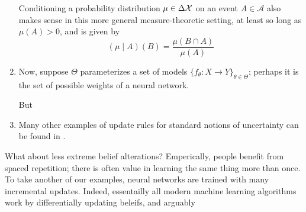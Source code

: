 \documentclass{article}
\begin{document}
\begin{enumerate}
    
    Conditioning a probability distribution $\mu \in \Delta\mathcal X$ on an event $A \in \mathcal A$ also makes sense in this more general measure-theoretic setting, at least so long as $\mu(A) > 0$, and is given by
    $$
        (\mu \mid A) (B) = \frac{\mu(B \cap A)}{\mu(A)}
    $$
    

    \item
    Now, suppose $\Theta$ parameterizes a set of models $\{ f_\theta : X \to Y \}_{\theta \in \Theta}$; perhaps it is the set of possible weights of a neural network. 
    
    But 

    \item Many other examples of update rules for standard notions of uncertainty can be found in \parencite[Ch. 3]{halpern2017reasoning}.    
\end{enumerate}
%

What about less extreme belief alterations? Emperically, people benefit from spaced repetition; there is often value in learning the same thing more than once.
To take another of our examples, neural networks are trained with many incremental updates. 
Indeed, essentailly all modern machine learning algorithms work by differentially updating beleifs, and arguably 
\end{document}
